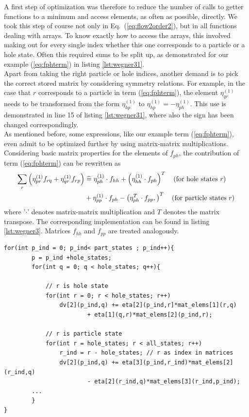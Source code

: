 A first step of optimization was therefore to reduce the number of calls to getter functions to a minimum and access elements, as often as possible, directly. We took this step of course not only in Eq.~(\ref{eq:flow2order2}), but in all functions dealing with arrays. To know exactly how to access the arrays, this involved making out for every single index whether this one corresponds to a particle or a hole state. Often this required sums to be split up, as demonstrated for our example (\ref{eq:fphterm}) in listing \ref{lst:wegner31}.\\ Apart from taking the right particle or hole indices, another demand is to pick the correct stored matrix by considering symmetry relations. For example, in the case that $r$ corresponds to a particle in term (\ref{eq:fphterm}), the element $\eta_{qr}^{(1)}$ needs to be transformed from the form $\eta_{hp}^{(1)}$ to $\eta_{hp}^{(1)} = -\eta_{ph}^{(1)}$. This use is demonstrated in line 15 of listing \ref{lst:wegner31}, where also the sign has been changed correspondingly.\\
As mentioned before, some expressions, like our example term (\ref{eq:fphterm}), even admit to be optimized further by using matrix-matrix multiplications. Considering basic matrix properties for the elements of $f_{ph}$, the contribution of term (\ref{eq:fphterm}) can be rewritten as
\begin{align*}
\sum_r \lb \eta_{pr}^{(1)} f_{rq} + \eta_{qr}^{(1)}f_{rp}\rb &\corresp \eta_{ph}^{(1)}\cdot f_{hh} + \lb \eta_{hh}^{(1)} \cdot f_{ph} \rb^T  \quad \text{(for hole states } r) \\
&+ \eta_{pp}^{(1)}\cdot f_{ph} - \lb \eta_{ph}^T \cdot f_{pp}, \rb^T \quad \text{(for particle states } r) 
\label{eq:fphmatrix}
\end{align*}
where '$\cdot$' denotes matrix-matrix multiplication and $T$ denotes the matrix transpose. The corresponding implementation can be found in listing \ref{lst:wegner3}. Matrices $f_{hh}$ and $f_{pp}$ are treated  analogously.


\begin{lstlisting}[float,basicstyle=\footnotesize, caption={Improvement of implementation in listing \ref{lst:wegner30} by accessing all elements directly, without getter functions.},label={lst:wegner31}]
for(int p_ind = 0; p_ind< part_states ; p_ind++){
        p = p_ind +hole_states;        
        for(int q = 0; q < hole_states; q++){  
              
            // r is hole state        
            for(int r = 0; r < hole_states; r++)      
                dv[2](p_ind,q) += eta[2](p_ind,r]*mat_elems[1](r,q)
                        + eta[1](q,r)*mat_elems[2](p_ind,r);           
                        
            // r is particle state        
            for(int r = hole_states; r < all_states; r++)  
                r_ind = r - hole_states; // r as index in matrices
                dv[2](p_ind,q) += eta[3](p_ind,r_ind)*mat_elems[2](r_ind,q)
                        - eta[2](r_ind,q)*mat_elems[3](r_ind,p_ind);
        ...
        }
}
\end{lstlisting}



